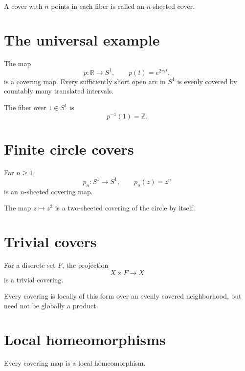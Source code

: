 A cover with \(n\) points in each fiber is called an \(n\)-sheeted cover.

\section{The universal example}

\begin{example}
\label{ex:viii10-circle-cover}
The map
\[
p:\mathbb R\to S^1,
\qquad
p(t)=e^{2\pi it},
\]
is a covering map.  Every sufficiently short open arc in \(S^1\) is evenly
covered by countably many translated intervals.
\end{example}

The fiber over \(1\in S^1\) is
\[
p^{-1}(1)=\mathbb Z.
\]

\section{Finite circle covers}

For \(n\ge1\),
\[
p_n:S^1\to S^1,\qquad p_n(z)=z^n
\]
is an \(n\)-sheeted covering map.

\begin{example}
The map \(z\mapsto z^2\) is a two-sheeted covering of the circle by itself.
\end{example}

\section{Trivial covers}

\begin{definition}
\label{def:viii10-trivial-cover}
For a discrete set \(F\), the projection
\[
X\times F\to X
\]
is a trivial covering.
\end{definition}

Every covering is locally of this form over an evenly covered neighborhood,
but need not be globally a product.

\section{Local homeomorphisms}

\begin{proposition}
\label{prop:viii10-local-homeomorphism}
Every covering map is a local homeomorphism.
\end{proposition}

